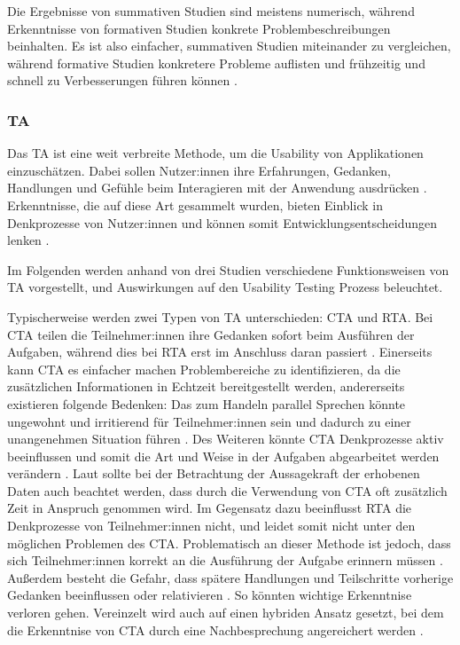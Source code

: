 Die Ergebnisse von summativen Studien sind meistens numerisch, während Erkenntnisse von formativen Studien konkrete Problembeschreibungen beinhalten. Es ist also einfacher, summativen Studien miteinander zu vergleichen, während formative Studien konkretere Probleme auflisten und frühzeitig und schnell zu Verbesserungen führen können \parencite{barnumUsabilityTesting2021}.

\subsubsection{\acl{TA}}
\label{sec:think-aloud}

Das \acf{TA} ist eine weit verbreite Methode, um die Usability von Applikationen einzuschätzen. Dabei sollen Nutzer:innen ihre Erfahrungen, Gedanken, Handlungen und Gefühle beim Interagieren mit der Anwendung ausdrücken \parencite{barnumUsabilityTesting2021}. Erkenntnisse, die auf diese Art gesammelt wurden, bieten Einblick in Denkprozesse von Nutzer:innen und können somit Entwicklungsentscheidungen lenken \parencite{alhadretiRethinkingThinking2018}.

Im Folgenden werden anhand von drei Studien verschiedene Funktionsweisen von \ac{TA} vorgestellt, und Auswirkungen auf den Usability Testing Prozess beleuchtet.

Typischerweise werden zwei Typen von \ac{TA} unterschieden: \ac{CTA} und \ac{RTA}. Bei \ac{CTA} teilen die Teilnehmer:innen ihre Gedanken sofort beim Ausführen der Aufgaben, während dies bei \ac{RTA} erst im Anschluss daran passiert \parencite{alhadretiRethinkingThinking2018}. Einerseits kann \ac{CTA} es einfacher machen Problembereiche zu identifizieren, da die zusätzlichen Informationen in Echtzeit bereitgestellt werden, andererseits existieren folgende Bedenken: Das zum Handeln parallel Sprechen könnte ungewohnt und irritierend für Teilnehmer:innen sein und dadurch zu einer unangenehmen Situation führen \parencite{alhadretiRethinkingThinking2018}. Des Weiteren könnte \ac{CTA} Denkprozesse aktiv beeinflussen und somit die Art und Weise in der Aufgaben abgearbeitet werden verändern \parencite{alhadretiRethinkingThinking2018}. Laut \citeauthor{alhadretiRethinkingThinking2018} sollte bei der Betrachtung der Aussagekraft der erhobenen Daten auch beachtet werden, dass durch die Verwendung von \ac{CTA} oft zusätzlich Zeit in Anspruch genommen wird. Im Gegensatz dazu beeinflusst \ac{RTA} die Denkprozesse von Teilnehmer:innen nicht, und leidet somit nicht unter den möglichen Problemen des \ac{CTA}. Problematisch an dieser Methode ist jedoch, dass sich Teilnehmer:innen korrekt an die Ausführung der Aufgabe erinnern müssen \parencite{alhadretiRethinkingThinking2018}. Außerdem besteht die Gefahr, dass spätere Handlungen und Teilschritte vorherige Gedanken beeinflussen oder relativieren \parencite{alhadretiRethinkingThinking2018}. So könnten wichtige Erkenntnise verloren gehen. Vereinzelt wird auch auf einen hybriden Ansatz gesetzt, bei dem die Erkenntnise von \ac{CTA} durch eine Nachbesprechung
angereichert werden \parencite{alhadretiRethinkingThinking2018}.

